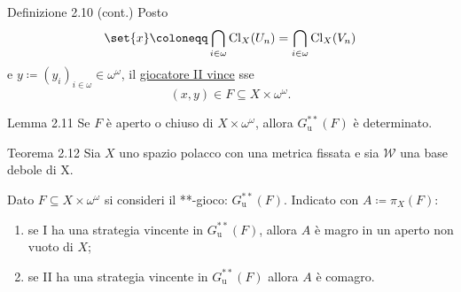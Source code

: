 \documentclass[babel]{beamer}
\renewcommand{\href}[2]{#2}
\begin{document}
\begin{frame}[label={sec:org27e3d89}]
\begin{block}{Definizione 2.10 (cont.)}
Posto
\begin{equation*}
\set{x}\coloneqq\bigcap_{i \in \omega} \operatorname{Cl}_{X}(U_{n}) = \bigcap_{i \in \omega} \operatorname{Cl}_{X}(V_{n})
\end{equation*}
e \(y\coloneqq (y_{i})_{i \in \omega} \in \omega^{\omega}\), il \uline{giocatore II vince} sse
\begin{equation*}
(x,y) \in F \subseteq X\times \omega^{\omega}.
\end{equation*}
\end{block}
\begin{alertblock}{Lemma 2.11}
Se \(F\) è aperto o chiuso di \(X\times\omega^{\omega}\), allora \(G^{**}_{\text{u}}(F)\) è determinato.
\end{alertblock}
\end{frame}
\begin{frame}[label={sec:orgfeb2e5d}]
\begin{alertblock}{Teorema 2.12}
Sia \(X\) uno spazio polacco con una metrica fissata e sia \(\mathcal{W}\) una base debole di X.

Dato \(F \subseteq X\times \omega^{\omega}\) si consideri il \href{../../../../../../../org/roam/20250513111844-gioco_di_banach_mazur.org}{**-gioco}: \(G^{**}_{\text{u}}(F)\). Indicato con \(A\coloneqq \pi_{X}(F)\):
\begin{enumerate}
\item se I ha una \href{../../../../../../../org/roam/20250513171520-giochi_di_gale_stewart.org}{strategia} \href{../../../../../../../org/roam/20250513171520-giochi_di_gale_stewart.org}{vincente} in \(G^{**}_{\text{u}}(F)\), allora \(A\) è magro in un aperto non vuoto di \(X\);
\item se II ha una \href{../../../../../../../org/roam/20250513171520-giochi_di_gale_stewart.org}{strategia} \href{../../../../../../../org/roam/20250513171520-giochi_di_gale_stewart.org}{vincente} in \(G^{**}_{\text{u}}(F)\) allora \(A\) è comagro.
\end{enumerate}
\end{alertblock}
\end{frame}
\end{document}
